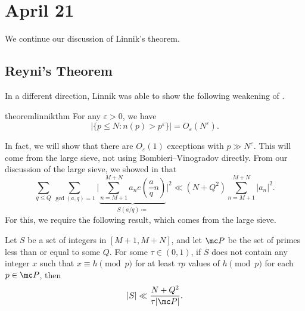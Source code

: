 \documentclass[../notes.tex]{subfiles}
\begin{document}
\section{April 21}

We continue our discussion of Linnik's theorem.

\subsection{Reyni's Theorem}
In a different direction, Linnik was able to show the following weakening of .
\begin{restatable}{theorem}{linnikthm} \label{thm:linnik}
	For any $\varepsilon>0$, we have
	\[\left|\{p\le N:n(p)>p^\varepsilon\}\right|=O_\varepsilon\left(N^\varepsilon\right).\]
\end{restatable}
In fact, we will show that there are $O_\varepsilon(1)$ exceptions with $p\gg N^\varepsilon$. This will come from the large sieve, not using Bombieri--Vinogradov directly. From our discussion of the large sieve, we showed in  that
\[\sum_{q\le Q}\sum_{\gcd(a,q)=1}\Bigg|\underbrace{\sum_{n=M+1}^{M+N}a_ne\left(\frac aqn\right)}_{S(a/q)\coloneqq}\Bigg|^2\ll\left(N+Q^2\right)\sum_{n=M+1}^{M+N}|a_n|^2.\]
For this, we require the following result, which comes from the large sieve.
\begin{theorem}[Reyni] \label{thm:reyni}
	Let $S$ be a set of integers in $[M+1,M+N]$, and let $\mc P$ be the set of primes less than or equal to some $Q$. For some $\tau\in(0,1)$, if $S$ does not contain any integer $x$ such that $x\equiv h\pmod p$ for at least $\tau p$ values of $h\pmod p$ for each $p\in\mc P$, then
	\[|S|\ll\frac{N+Q^2}{\tau|\mc P|}.\]
\end{theorem}
\end{document}
